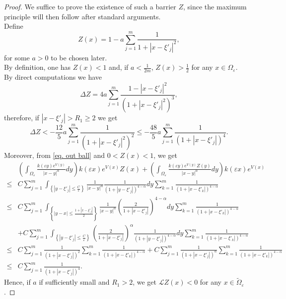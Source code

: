 \documentclass[11pt]{article}
\begin{document}
\begin{proof}
We suffice to prove the existence of such a barrier $Z$, since the maximum principle will then follow after standard arguments.\\
Define
$$Z(x)=1-a\sum_{j=1}^m\frac1{1+\left|x-\xi'_j\right|^2},$$
for some $a>0$ to be chosen later.\\
By definition, one has $Z(x)<1$ and, if $a<\frac1{2m}$, $Z(x)>\frac12$ for any $x\in\Omega_\varepsilon$.\\
By direct computations we have
$$\Delta Z=4a\sum_{j=1}^m\frac{1-\left|x-\xi'_j\right|^2}{\left(1+\left|x-\xi'_j\right|^2\right)^3},$$
therefore, if $|x-\xi'_j|>R_1\ge2$ we get
$$\Delta Z<-\frac{12}5a\sum_{j=1}^m\frac1{\left(1+\left|x-\xi'_j\right|^2\right)^2}\le-\frac{48}5a\sum_{j=1}^m\frac1{\left(1+\left|x-\xi'_j\right|\right)^4}.$$
Moreover, from \eqref{eq. out ball} and $0<Z(x)<1$, we get
\begin{align}
\nonumber&\left(\int_{\Omega_\varepsilon}\frac{k(\varepsilon y)e^{V(y)}}{|x-y|^\alpha}dy\right)k(\varepsilon x)e^{V(x)}Z(x)+\left(\int_{\Omega_\varepsilon}\frac{k(\varepsilon y)e^{V(y)}Z(y)}{|x-y|^\alpha}dy\right)k(\varepsilon x)e^{V(x)}\\
\nonumber\le&C\sum_{j=1}^m\int_{\left\{\left|y-\xi'_j\right|\le\frac C\varepsilon\right\}}\frac1{|x-y|^\alpha}\frac1{\left(1+\left|y-\xi'_j\right|\right)^{4-\alpha}}dy\sum_{k=1}^m\frac1{\left(1+\left|x-\xi'_k\right|\right)^{4-\alpha}}\\
\nonumber\le&C\sum_{j=1}^m\int_{\left\{\left|y-x\right|\le\frac{1+\left|x-\xi'_j\right|}2\right\}}\frac1{|x-y|^\alpha}\left(\frac2{1+\left|x-\xi'_j\right|}\right)^{4-\alpha}dy\sum_{k=1}^m\frac1{\left(1+\left|x-\xi'_k\right|\right)^{4-\alpha}}\\
\nonumber&+C\sum_{j=1}^m\int_{\left\{\left|y-\xi'_j\right|\le\frac C\varepsilon\right\}}\left(\frac2{1+\left|x-\xi'_j\right|}\right)^\alpha\frac1{\left(1+\left|y-\xi'_j\right|\right)^{4-\alpha}}dy\sum_{k=1}^m\frac1{\left(1+\left|x-\xi'_k\right|\right)^{4-\alpha}}\\
\nonumber\le&C\sum_{j=1}^m\frac1{\left(1+\left|x-\xi'_j\right|\right)^2}\sum_{k=1}^m\frac1{\left(1+\left|x-\xi'_k\right|\right)^{4-\alpha}}+C\sum_{j=1}^m\frac1{\left(1+\left|x-\xi'_j\right|\right)^\alpha}\sum_{k=1}^m\frac1{\left(1+\left|x-\xi'_k\right|\right)^{4-\alpha}}\\
\label{integralestimate}\le&C\sum_{j=1}^m\frac1{\left(1+\left|x-\xi'_j\right|\right)^4}.
\end{align}
Hence, if $a$ if sufficiently small and $R_1>2$, we get $\mathcal LZ(x)<0$ for any $x\in\widetilde\Omega_\varepsilon$.
\end{proof}\
\end{document}
